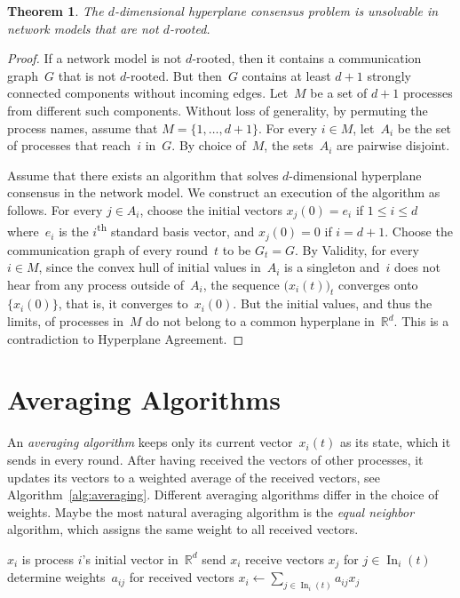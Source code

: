 \documentclass{article}
\newcommand{\INITIALLY}{\REQUIRE{}}
\newcommand{\ROUND}{\ENSURE{}}
\newtheorem{thm}{Theorem}
\newcommand{\IR}{\mathbb{R}}
\renewcommand{\leq}{\leqslant}
\DeclareMathOperator\In{In}
\begin{document}
\begin{thm}\label{lem:imposs}
The $d$-dimensional hyperplane consensus problem is unsolvable in network
models that are not $d$-rooted.
\end{thm}
\begin{proof}
If a network model is not $d$-rooted, then it contains a communication
graph~$G$ that is not $d$-rooted.
But then~$G$ contains at least $d+1$ strongly connected components without incoming edges.
Let~$M$ be a set of $d+1$ processes from different such components.
Without loss of generality, by permuting the process names, assume that $M =
\{1,\dots,d+1\}$.
For every $i\in M$, let~$A_i$ be the set of processes that reach~$i$ in~$G$.
By choice of~$M$, the sets~$A_i$ are pairwise disjoint.%

Assume that there exists an algorithm that solves $d$-dimensional hyperplane
consensus in the network model.
We construct an execution of the algorithm as follows.
For every $j\in A_i$, choose the initial vectors $x_j(0) = e_i$ if $1\leq i \leq d$ where~$e_i$
is the $i$\textsuperscript{th} standard basis vector, and $x_j(0) = 0$ if $i = d+1$.
Choose the communication graph of every round~$t$ to be $G_t = G$.
By Validity, for every $i\in M$, since the convex hull of initial values
in~$A_i$ is a singleton and~$i$ does not hear from any process outside
of~$A_i$, the sequence $\big(x_i(t)\big)_t$ converges onto $\{x_i(0)\}$, that is, it
converges to~$x_i(0)$.
But the initial values, and thus the limits, of processes in~$M$ do not
belong to a common hyperplane in~$\IR^d$.
This is a contradiction to Hyperplane Agreement.
\end{proof}


\section{Averaging Algorithms}\label{sec:algos}

An \emph{averaging algorithm} keeps only its current vector~$x_i(t)$ as its
state, which it sends in every round.
After having received the vectors of other processes, it updates its vectors to
a weighted average of the received vectors, see Algorithm~\ref{alg:averaging}.
Different averaging algorithms differ in the choice of weights.
Maybe the most natural averaging algorithm is the \emph{equal neighbor}
algorithm, which assigns the same weight to all received vectors.

\begin{algorithm}[ht]
\begin{algorithmic}[1]
\INITIALLY{}
\STATE $x_i$ is process $i$'s initial vector in~$\IR^d$ 
\ROUND{}
\STATE send $x_i$
\STATE receive vectors $x_j$ for $j\in \In_i(t)$
\STATE determine weights~$a_{ij}$ for received vectors
\STATE 
$\displaystyle x_i \gets \sum_{j\in \In_i(t)} a_{ij} x_j$
\end{algorithmic}
\caption{Averaging algorithm for process $i$}
\label{alg:averaging}
\end{algorithm}
\end{document}
